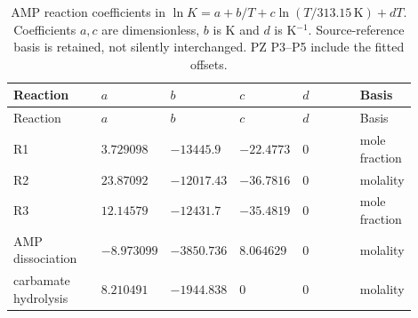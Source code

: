 \begingroup\small\setlength{\tabcolsep}{3pt}
\begin{longtable}{@{}>{\raggedright\arraybackslash}p{0.22\linewidth}>{\raggedright\arraybackslash}p{0.13\linewidth}>{\raggedright\arraybackslash}p{0.13\linewidth}>{\raggedright\arraybackslash}p{0.13\linewidth}>{\raggedright\arraybackslash}p{0.15\linewidth}>{\raggedright\arraybackslash}p{0.14\linewidth}@{}}
\caption{AMP reaction coefficients in $\ln K=a+b/T+c\ln(T/313.15\,\mathrm K)+dT$. Coefficients $a,c$ are dimensionless, $b$ is K and $d$ is K$^{-1}$. Source-reference basis is retained, not silently interchanged. PZ P3--P5 include the fitted offsets.}\label{tab:p2-amp-laws}\\
\toprule Reaction & $a$ & $b$ & $c$ & $d$ & Basis \\ \midrule\endfirsthead
\toprule Reaction & $a$ & $b$ & $c$ & $d$ & Basis \\ \midrule\endhead
\bottomrule\endfoot
R1 & $3.729098$ & $-13445.9$ & $-22.4773$ & $0$ & mole fraction \\
R2 & $23.87092$ & $-12017.43$ & $-36.7816$ & $0$ & molality \\
R3 & $12.14579$ & $-12431.7$ & $-35.4819$ & $0$ & mole fraction \\
AMP dissociation & $-8.973099$ & $-3850.736$ & $8.064629$ & $0$ & molality \\
carbamate hydrolysis & $8.210491$ & $-1944.838$ & $0$ & $0$ & molality \\
\end{longtable}\endgroup

